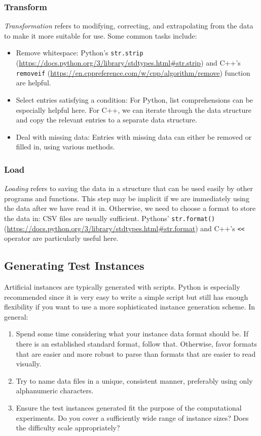 \documentclass[12pt]{article}
\begin{document}
\subsubsection{Transform}
\emph{Transformation} refers to modifying, correcting, and extrapolating from the data to make it more suitable for use. Some common tasks include:
\begin{itemize}
    \item Remove whitespace: Python's \texttt{str.strip} (\url{https://docs.python.org/3/library/stdtypes.html#str.strip}) and C++'s \texttt{remove\ttul if} (\url{https://en.cppreference.com/w/cpp/algorithm/remove}) function are helpful.
	\item Select entries satisfying a condition: For Python, list comprehensions can be especially helpful here. For C++, we can iterate through the data structure and copy the relevant entries to a separate data structure.
	\item Deal with missing data: Entries with missing data can either be removed or filled in, using various methods.
\end{itemize}

\subsubsection{Load}
\emph{Loading} refers to saving the data in a structure that can be used easily by other programs and functions. This step may be implicit if we are immediately using the data after we have read it in. Otherwise, we need to choose a format to store the data in: CSV files are usually sufficient. Pythons' \texttt{str.format()} (\url{https://docs.python.org/3/library/stdtypes.html#str.format}) and C++'s \texttt{<<} operator are particularly useful here.

\subsection{Generating Test Instances}
Artificial instances are typically generated with scripts. Python is especially recommended since it is very easy to write a simple script but still has enough flexibility if you want to use a more sophisticated instance generation scheme. In general:
\begin{enumerate}
    \item Spend some time considering what your instance data format should be. If there is an established standard format, follow that. Otherwise, favor formats that are easier and more robust to parse than formats that are easier to read visually.
    \item Try to name data files in a unique, consistent manner, preferably using only alphanumeric characters.
    \item Ensure the test instances generated fit the purpose of the computational experiments. Do you cover a sufficiently wide range of instance sizes? Does the difficulty scale appropriately?
\end{enumerate}

\printbibliography
\end{document}
